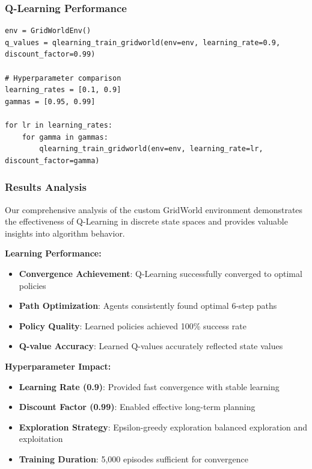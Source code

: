 \documentclass[12pt]{article}
\begin{document}
{{{\subsubsection{Q-Learning Performance}

\begin{verbatim}
env = GridWorldEnv()
q_values = qlearning_train_gridworld(env=env, learning_rate=0.9, discount_factor=0.99)

# Hyperparameter comparison
learning_rates = [0.1, 0.9]  
gammas = [0.95, 0.99]

for lr in learning_rates:
    for gamma in gammas:
        qlearning_train_gridworld(env=env, learning_rate=lr, discount_factor=gamma)
\end{verbatim}

\subsubsection{Results Analysis}

Our comprehensive analysis of the custom GridWorld environment demonstrates the effectiveness of Q-Learning in discrete state spaces and provides valuable insights into algorithm behavior.

\textbf{Learning Performance:}
\begin{itemize}
    \item \textbf{Convergence Achievement}: Q-Learning successfully converged to optimal policies
    \item \textbf{Path Optimization}: Agents consistently found optimal 6-step paths
    \item \textbf{Policy Quality}: Learned policies achieved 100\% success rate
    \item \textbf{Q-value Accuracy}: Learned Q-values accurately reflected state values
\end{itemize}

\textbf{Hyperparameter Impact:}
\begin{itemize}
    \item \textbf{Learning Rate (0.9)}: Provided fast convergence with stable learning
    \item \textbf{Discount Factor (0.99)}: Enabled effective long-term planning
    \item \textbf{Exploration Strategy}: Epsilon-greedy exploration balanced exploration and exploitation
    \item \textbf{Training Duration}: 5,000 episodes sufficient for convergence
\end{itemize}

}}}
\end{document}
